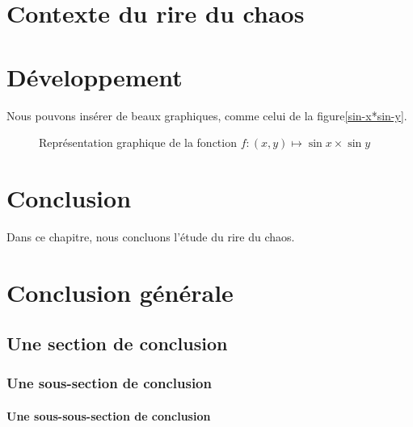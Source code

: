\documentclass[12pt,space=onehalf,version=final]{yathesis}
\begin{document}
\chapter{Contexte du rire du chaos}

\lipsum[26-32]
\chapter{Développement}

Nous pouvons insérer de beaux graphiques, comme celui de la
figure\vref{sin-x*sin-y}.
\begin{figure}[ht]
  \centering
  \capstart
  \caption{Représentation graphique de la fonction $f:(x,y)\mapsto
    \sin x\times\sin y$}
  \label{sin-x*sin-y}
\end{figure}

\lipsum[3-10]
\chapter{Conclusion}
Dans ce chapitre, nous concluons l'étude du rire du chaos.

\lipsum[6-9]
%
\chapter*{Conclusion générale}
\lipsum[26-27]
\section{Une section de conclusion}
\lipsum[28-29]
\subsection{Une sous-section de conclusion}
\lipsum[29-31]
\subsubsection{Une sous-sous-section de conclusion}
\lipsum[31-35]
\end{document}

